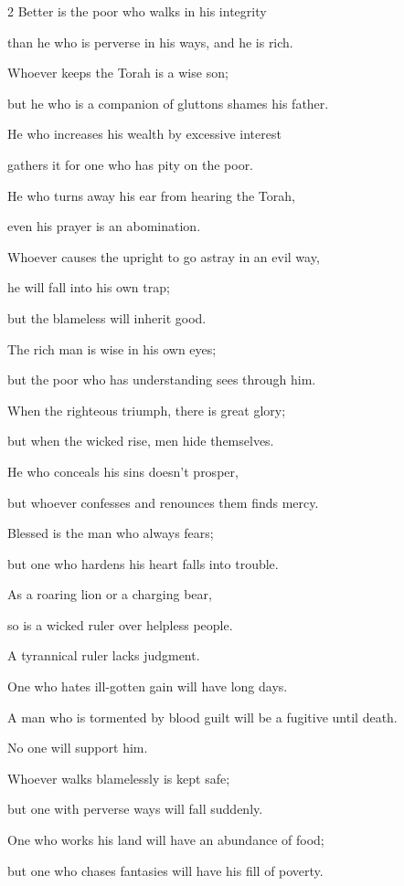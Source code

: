 \begin{multicols}{2}
\myverse{}Better is the poor who walks in his integrity

than he who is perverse in his ways, and he is rich.


\myverse{}Whoever keeps the Torah is a wise son;

but he who is a companion of gluttons shames his father.


\myverse{}He who increases his wealth by excessive interest

gathers it for one who has pity on the poor.


\myverse{}He who turns away his ear from hearing the Torah,

even his prayer is an abomination.


\myverse{}Whoever causes the upright to go astray in an evil way,

he will fall into his own trap;

but the blameless will inherit good.


\myverse{}The rich man is wise in his own eyes;

but the poor who has understanding sees through him.


\myverse{}When the righteous triumph, there is great glory;

but when the wicked rise, men hide themselves.


\myverse{}He who conceals his sins doesn’t prosper,

but whoever confesses and renounces them finds mercy.


\myverse{}Blessed is the man who always fears;

but one who hardens his heart falls into trouble.


\myverse{}As a roaring lion or a charging bear,

so is a wicked ruler over helpless people.


\myverse{}A tyrannical ruler lacks judgment.

One who hates ill-gotten gain will have long days.


\myverse{}A man who is tormented by blood guilt will be a fugitive until
death.

No one will support him.


\myverse{}Whoever walks blamelessly is kept safe;

but one with perverse ways will fall suddenly.


\myverse{}One who works his land will have an abundance of food;

but one who chases fantasies will have his fill of poverty.



\end{multicols}
